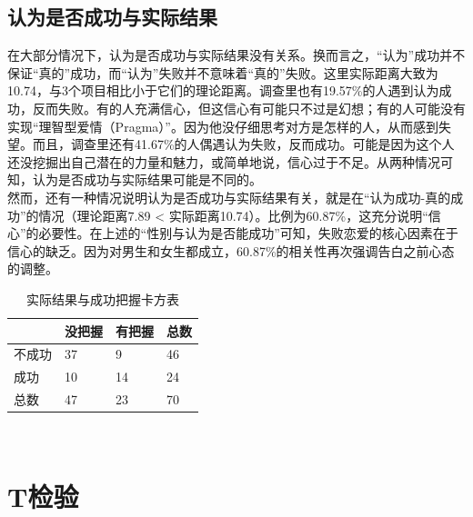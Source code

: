 \documentclass[10pt, a4paper, twocolumn]{ctexart}
\begin{document}
\subsection{认为是否成功与实际结果}
在大部分情况下，认为是否成功与实际结果没有关系。换而言之，“认为”成功并不保证“真的”成功，而“认为”失败并不意味着“真的”失败。这里实际距离大致为10.74，与3个项目相比小于它们的理论距离。调查里也有19.57\%的人遇到认为成功，反而失败。有的人充满信心，但这信心有可能只不过是幻想；有的人可能没有实现“理智型爱情（Pragma）”。因为他没仔细思考对方是怎样的人，从而感到失望。而且，调查里还有41.67\%的人偶遇认为失败，反而成功。可能是因为这个人还没挖掘出自己潜在的力量和魅力，或简单地说，信心过于不足。从两种情况可知，认为是否成功与实际结果可能是不同的。\\
\indent 然而，还有一种情况说明认为是否成功与实际结果有关，就是在“认为成功-真的成功”的情况（理论距离7.89 < 实际距离10.74）。比例为60.87\%，这充分说明“信心”的必要性。在上述的“性别与认为是否能成功”可知，失败恋爱的核心因素在于信心的缺乏。因为对男生和女生都成立，60.87\%的相关性再次强调告白之前心态的调整。
\begin{table}[htbp]
	\small
	\caption{实际结果与成功把握卡方表}
	\centering
	\begin{tabular}{llll}
		 & 没把握 & 有把握 & 总数 \\
		\midrule
		不成功&37&9&46 \\
		成功&10&14&24 \\
		\midrule
		总数&47&23&70\\
		\bottomrule
	\end{tabular}
\end{table}
\\
\section{T检验}
\end{document}
